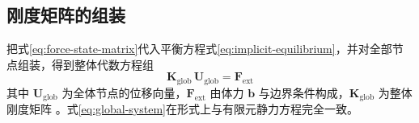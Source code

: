 \subsection{刚度矩阵的组装}\label{sec:implicit-stiffness}

把式\eqref{eq:force-state-matrix}代入平衡方程式\eqref{eq:implicit-equilibrium}，并对全部节点组装，得到整体代数方程组
\begin{equation}
  \mathbf{K}_{\mathrm{glob}}\,\mathbf{U}_{\mathrm{glob}}=\mathbf{F}_{\mathrm{ext}}
  \label{eq:global-system}
\end{equation}
其中 $\mathbf{U}_{\mathrm{glob}}$ 为全体节点的位移向量，$\mathbf{F}_{\mathrm{ext}}$ 由体力 $\mathbf{b}$ 与边界条件构成，$\mathbf{K}_{\mathrm{glob}}$ 为整体刚度矩阵 \cite{Breitenfeld2014}。式\eqref{eq:global-system}在形式上与有限元静力方程完全一致。

